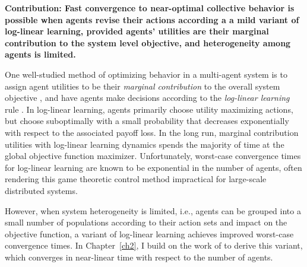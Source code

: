 
\smallskip

\noindent \textbf{Contribution: Fast convergence to near-optimal collective behavior is possible when agents revise their actions according a a mild variant of log-linear learning, provided agents' utilities are their marginal contribution to the system level objective, and heterogeneity among agents is limited.}




One well-studied method of optimizing behavior in a multi-agent system is to assign agent utilities to be their {\it marginal contribution} to the overall system objective \cite{Wolpert1999}, and have agents make decisions according to the {\it log-linear learning} rule \cite{Blume1993}. In log-linear learning, agents primarily choose utility maximizing actions, but choose suboptimally with a small probability that decreases exponentially with respect to the associated payoff loss. In the long run, marginal contribution utilities with log-linear learning dynamics spends the majority of time at the global objective function maximizer. Unfortunately, worst-case convergence times for log-linear learning are known to be exponential in the number of agents, \cite{Shah2010} often rendering this game theoretic control method impractical for large-scale distributed systems. 

However, when system heterogeneity is limited, i.e., agents can be grouped into a small number of populations according to their action sets and impact on the objective function, a variant of log-linear learning achieves improved worst-case convergence times. In Chapter~\ref{ch2}, I build on the work of \cite{Shah2010} to derive this variant, which converges in near-linear time with respect to the number of agents. 








